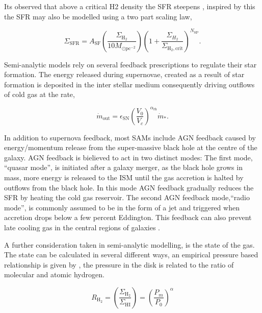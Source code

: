 Its observed that above a critical H2 density the SFR steepens \citep{Narayanan2012ALaw}, inspired by this the SFR may also be modelled using a two part scaling law, 

\begin{equation}
    \Sigma_{\mathrm{SFR}}=A_{\mathrm{SF}}\left(\frac{\Sigma_{\mathrm{H}_{2}}}{10 M_{\odot \mathrm{pc}^{-2}}}\right)\left(1+\frac{\Sigma_{H_{2}}}{\Sigma_{\mathrm{H}_{2}, \mathrm{crit}}}\right)^{N_{\mathrm{SP}}}.
\end{equation}

Semi-analytic models rely on several feedback prescriptions to regulate their star formation. The energy released during supernovae, created as a result of star formation is deposited in the inter stellar medium consequently driving outflows of cold gas at the rate,

\begin{equation}
    \dot{m}_{\mathrm{out}}=\epsilon_{\mathrm{SN}}\left(\frac{V_{0}}{V_{c}}\right)^{\alpha_{\mathrm{rh}}} \dot{m}_{*}.
\end{equation}

In addition to supernova feedback, most SAMs include AGN feedback caused by energy/momentum release from the super-massive black hole at the centre of the galaxy. AGN feedback is bielieved to act in two distinct modes: The first mode, ``quasar mode'', is initiated after a galaxy merger, as the black hole grows in mass, more energy is released to the ISM until the gas accretion is halted by outflows from the black hole. In this mode AGN feedback gradually reduces the SFR by heating the cold gas reservoir. The second AGN feedback mode,``radio mode'', is commonly assumed to be in the form of a jet and triggered when accretion drops below a few percent Eddington. This feedback can also prevent late cooling gas in the central regions of galaxies \cite{Croton2007Thequenching}.

A further consideration taken in semi-analytic modelling, is the state of the gas. The state can be calculated in several different ways, an empirical pressure based relationship is given by \citet{Blitz2006TheRelation}, the pressure in the disk is related to the ratio of molecular and atomic hydrogen. 

\begin{equation}
    R_{\mathrm{H}_{2}}=\left(\frac{\Sigma_{\mathrm{H}_{2}}}{\Sigma_{\mathrm{HI}}}\right)=\left(\frac{P_{m}}{P_{0}}\right)^{\alpha}
\end{equation}

